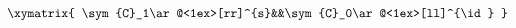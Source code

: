 \begin{equation}
\begin{aligned}
\xymatrix{
  \sym{C}_1\ar@<1ex>[rr]^{s}&&\sym{C}_0\ar@<1ex>[ll]^{\id}
}
\end{aligned}
\end{equation}

